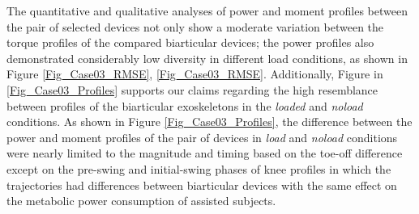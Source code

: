\documentclass[10pt,letterpaper]{article}
\begin{document}
The quantitative and qualitative analyses of power and moment profiles between the pair of selected devices not only show a moderate variation between the torque profiles of the compared biarticular devices; the power profiles also demonstrated considerably low diversity in different load conditions, as shown in Figure \ref{Fig_Case03_RMSE}, \ref{Fig_Case03_RMSE}. Additionally, Figure in \ref{Fig_Case03_Profiles} supports our claims regarding the high resemblance between profiles of the biarticular exoskeletons in the {\it loaded} and {\it noload} conditions. As shown in Figure \ref{Fig_Case03_Profiles}, the difference between the power and moment profiles of the pair of devices in {\it load} and {\it noload} conditions were nearly limited to the magnitude and timing based on the toe-off difference except on the pre-swing and initial-swing phases of knee profiles in which the trajectories had differences between biarticular devices with the same effect on the metabolic power consumption of assisted subjects.\\
\end{document}
